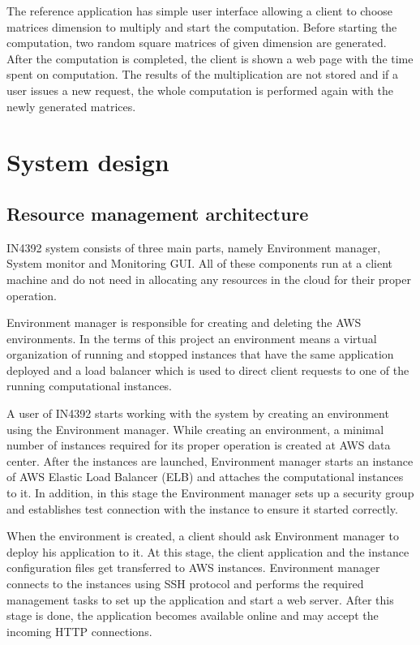 \documentclass[conference]{IEEEtran}
\begin{document}
The reference application has simple user interface allowing a client to choose matrices dimension to multiply and start the computation. Before starting the computation, two random square matrices of given dimension are generated. After the computation is completed, the client is shown a web page with the time spent on computation. The results of the multiplication are not stored and if a user issues a new request, the whole computation is performed again with the newly generated matrices.

\section{System design}
\subsection{Resource management architecture}

IN4392 system consists of three main parts, namely Environment manager, System monitor and Monitoring GUI. All of these components run at a client machine and do not need in allocating any resources in the cloud for their proper operation.

Environment manager is responsible for creating and deleting the AWS environments. In the terms of this project an environment means a virtual organization of running and stopped instances that have the same application deployed and a load balancer which is used to direct client requests to one of the running computational instances.

A user of IN4392 starts working with the system by creating an environment using the Environment manager. While creating an environment, a minimal number of instances required for its proper operation is created at AWS data center. After the instances are launched, Environment manager starts an instance of AWS Elastic Load Balancer (ELB) and attaches the computational instances to it. In addition, in this stage the Environment manager sets up a security group and establishes test connection with the instance to ensure it started correctly.

When the environment is created, a client should ask Environment manager to deploy his application to it. At this stage, the client application and the instance configuration files get transferred to AWS instances. Environment manager connects to the instances using SSH protocol and performs the required management tasks to set up the application and start a web server. After this stage is done, the application becomes available online and may accept the incoming HTTP connections. 
\end{document}
